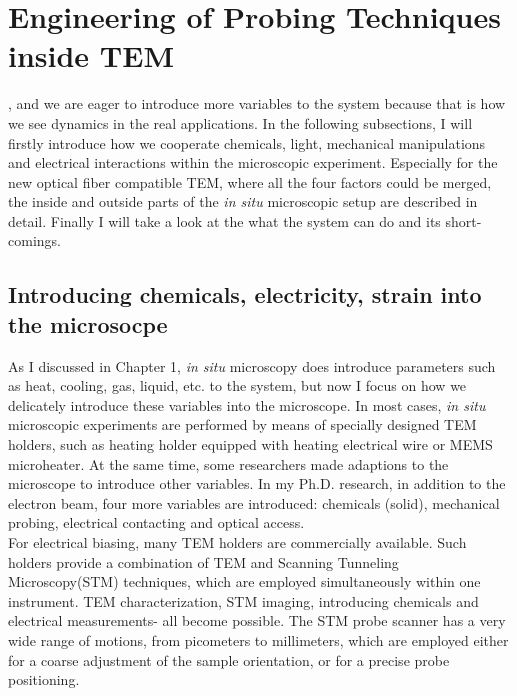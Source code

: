 

\chapter{Engineering of Probing Techniques inside TEM}

, and we are eager to introduce more variables to the system because that is how we see dynamics in the real applications.
In the following subsections, I will firstly introduce how we cooperate chemicals, light, mechanical manipulations and electrical interactions within the microscopic experiment. 
Especially for the new optical fiber compatible TEM, where all the four factors could be merged, the inside and outside parts of the \emph{in situ} microscopic setup are described in detail. 
Finally I will take a look at the what the system can do and its short-comings. 

\section{Introducing chemicals, electricity, strain into the microsocpe}

As I discussed in Chapter 1, \emph{in situ} microscopy does introduce parameters such as heat, cooling, gas, liquid, etc. to the system, but now I focus on how we delicately introduce these variables into the  microscope. In most cases, {\em in situ} microscopic experiments are performed by means of specially designed TEM holders, such as heating holder equipped with heating electrical wire or MEMS microheater. At the same time, some researchers made adaptions to the  microscope to introduce other variables. In my Ph.D. research, in addition to the electron beam, four more variables are introduced: chemicals (solid), mechanical probing, electrical contacting and optical access. \\

For electrical biasing, many TEM holders are commercially available. Such holders provide a combination of TEM and Scanning Tunneling Microscopy(STM) techniques, which are employed simultaneously within one instrument. TEM characterization, STM imaging, introducing chemicals and electrical measurements- all become possible. The STM probe scanner has a very wide range of motions, from picometers to millimeters, which are employed either for a coarse adjustment of the sample orientation, or for a precise probe positioning. \\

